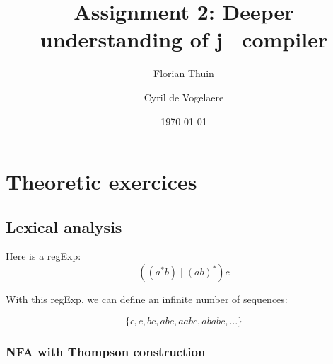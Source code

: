 \documentclass[a4paper, 11pt]{article}
\author{Florian Thuin \and Cyril de Vogelaere}
\date{\today}
\title{Assignment 2: Deeper understanding of j-- compiler}
\begin{document}
    \maketitle
    \tableofcontents
    \clearpage{}

	\section{Theoretic exercices}
    \subsection{Lexical analysis}
    Here is a regExp:
    $$ ((a^{*}b) \mid {(ab)}^{*})c $$

    With this regExp, we can define an infinite number of sequences:

    $$ \{ \epsilon, c, bc, abc, aabc, ababc, \ldots \} $$

    \subsubsection{NFA with Thompson construction}
\end{document}
